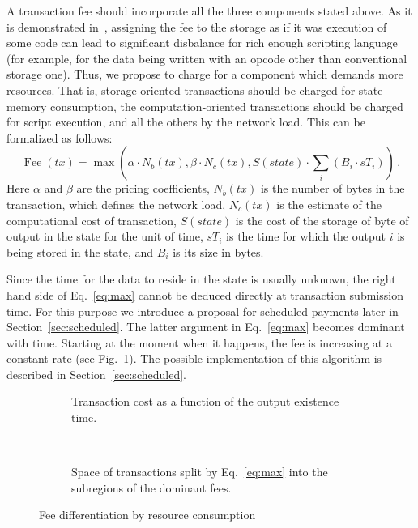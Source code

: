 \documentclass[]{llncs}   %
\begin{document}
A transaction fee should incorporate all the three components stated above.  As
it is demonstrated in~\cite{Earlz2017}, assigning the fee to the storage as if
it was execution of some code can lead to significant disbalance for rich enough
scripting language (for example, for the data being written with an opcode other
than conventional storage one).  Thus, we propose to charge for a component
which demands more resources. That is, storage-oriented transactions should be
charged for state memory consumption, the computation-oriented transactions
should be charged for script execution, and all the others by the network load.
This can be formalized as follows:
\begin{equation}
    \operatorname{Fee}(tx) = \max\left(\alpha \cdot N_b(tx), \beta \cdot N_c(tx),
    S(state) \cdot \sum_i (B_i \cdot sT_i) \right)\,.
    \label{eq:max}
\end{equation}
Here $\alpha$ and $\beta$ are the pricing coefficients, $N_b(tx)$ is the number
of bytes in the transaction, which defines the network load, $N_c(tx)$ is the
estimate of the computational cost of transaction, $S(state)$ is the cost of the
storage of byte of output in the state for the unit of time, $sT_i$ is the time
for which the output $i$ is being stored in the state, and $B_i$ is its size in
bytes.

Since the time for the data to reside in the state is usually unknown,
the right hand side of Eq.~\eqref{eq:max} cannot be deduced directly at
transaction submission time. For this purpose we introduce a proposal for 
scheduled payments later in Section~\ref{sec:scheduled}. The latter
argument in Eq.~\eqref{eq:max} becomes dominant with time. Starting at the moment when it happens, the
fee is increasing at a constant rate (see Fig.~\ref{fig:max_t}). The possible implementation of this 
algorithm is described in Section~\ref{sec:scheduled}.
\begin{figure}
    \centering
    \begin{subfigure}[b]{.45\textwidth}
    
    \caption{Transaction cost as a function of the output existence time.
        \newline
        \label{fig:max_t}}
    \end{subfigure}
    ~
    \begin{subfigure}[b]{.45\textwidth}
        
        \caption{Space of transactions split by
            Eq.~\eqref{eq:max} into the subregions of the dominant fees.
            \label{fig:max}}
        \end{subfigure}
        \caption{Fee differentiation by resource consumption}
\end{figure}
\end{document}

